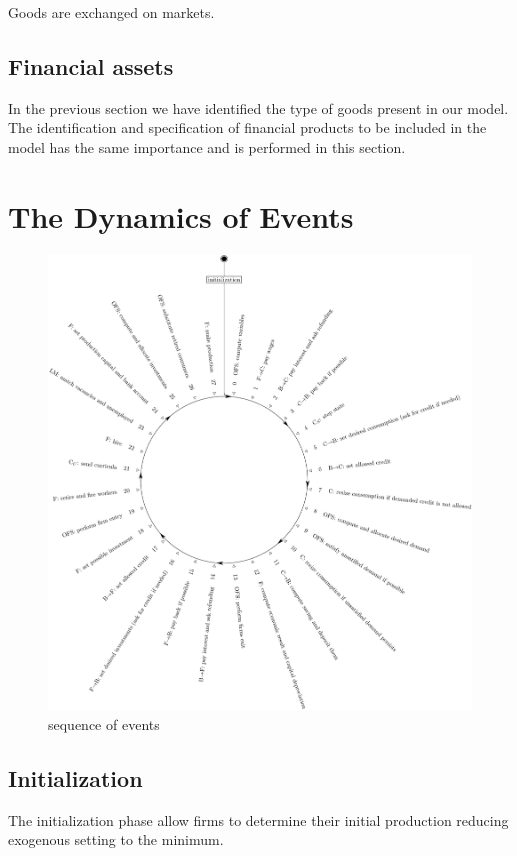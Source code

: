 \documentclass{book}
\begin{document}
Goods are exchanged on markets.

\section{Financial assets}

In the previous section we have identified the type of goods present in our model. The identification and specification of financial products to be included in the model has the same importance and is performed in this section. 

\newpage
\chapter{The Dynamics of Events}\label{chap:events}

\begin{figure}[htp]
	\centering
\includegraphics[scale=0.5]{visual.pdf}
	\caption{sequence of events}
	\label{fig:sequence}
\end{figure}

\section{Initialization}
The initialization phase allow firms to determine their initial production reducing exogenous setting to the minimum. 
\end{document}
